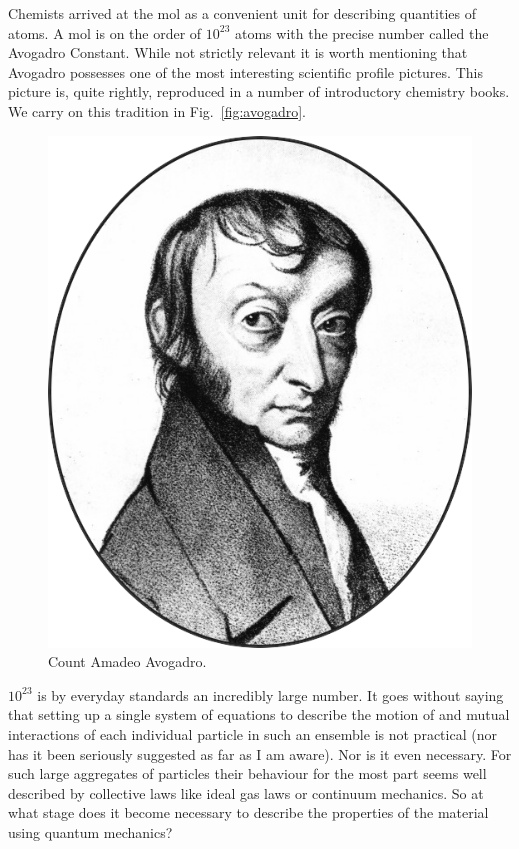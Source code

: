 Chemists arrived at the mol as a convenient unit for describing
quantities of atoms. A mol is on the order of $10^{23}$ atoms with
the precise number called the Avogadro Constant. While not strictly relevant
it is worth mentioning that Avogadro possesses one of the most
interesting scientific profile pictures. This picture is, quite rightly, reproduced
in a number of introductory chemistry books. We carry on this tradition 
in Fig.~\ref{fig:avogadro}.
%
\begin{figure}
\begin{center}
\includegraphics[scale=0.4]{./intro/Amadeo_Avogadro.png}
\end{center}
\caption{Count Amadeo Avogadro.}
\end{figure}
%
$10^{23}$ is by everyday standards an incredibly large number. 
It goes without saying that setting up a single system of 
equations to describe the motion of and mutual 
interactions of each individual particle in such an ensemble is not practical 
(nor has it been seriously suggested as far as I am aware). Nor is it even necessary.
For such large aggregates of particles their behaviour for the most part seems 
well described by collective laws like ideal gas laws or continuum mechanics. 
So at what stage does it become necessary to describe the properties of the material
using quantum mechanics? 

